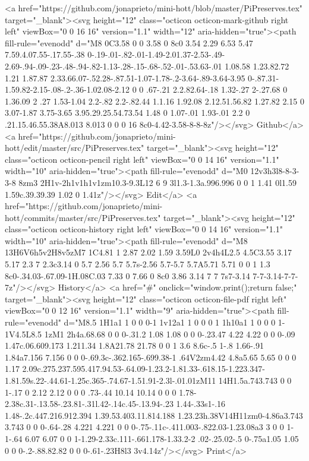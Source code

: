       <a href="https://github.com/jonaprieto/mini-hott/blob/master/PiPreserves.tex" target="_blank"><svg height="12" class="octicon octicon-mark-github right left" viewBox="0 0 16 16" version="1.1" width="12" aria-hidden="true"><path fill-rule="evenodd" d="M8 0C3.58 0 0 3.58 0 8c0 3.54 2.29 6.53 5.47 7.59.4.07.55-.17.55-.38 0-.19-.01-.82-.01-1.49-2.01.37-2.53-.49-2.69-.94-.09-.23-.48-.94-.82-1.13-.28-.15-.68-.52-.01-.53.63-.01 1.08.58 1.23.82.72 1.21 1.87.87 2.33.66.07-.52.28-.87.51-1.07-1.78-.2-3.64-.89-3.64-3.95 0-.87.31-1.59.82-2.15-.08-.2-.36-1.02.08-2.12 0 0 .67-.21 2.2.82.64-.18 1.32-.27 2-.27.68 0 1.36.09 2 .27 1.53-1.04 2.2-.82 2.2-.82.44 1.1.16 1.92.08 2.12.51.56.82 1.27.82 2.15 0 3.07-1.87 3.75-3.65 3.95.29.25.54.73.54 1.48 0 1.07-.01 1.93-.01 2.2 0 .21.15.46.55.38A8.013 8.013 0 0 0 16 8c0-4.42-3.58-8-8-8z"/></svg> Github</a>
      <a href="https://github.com/jonaprieto/mini-hott/edit/master/src/PiPreserves.tex" target="_blank"><svg height="12" class="octicon octicon-pencil right left" viewBox="0 0 14 16" version="1.1" width="10" aria-hidden="true"><path fill-rule="evenodd" d="M0 12v3h3l8-8-3-3-8 8zm3 2H1v-2h1v1h1v1zm10.3-9.3L12 6 9 3l1.3-1.3a.996.996 0 0 1 1.41 0l1.59 1.59c.39.39.39 1.02 0 1.41z"/></svg> Edit</a>
      <a href="https://github.com/jonaprieto/mini-hott/commits/master/src/PiPreserves.tex" target="_blank"><svg height="12" class="octicon octicon-history right left" viewBox="0 0 14 16" version="1.1" width="10" aria-hidden="true"><path fill-rule="evenodd" d="M8 13H6V6h5v2H8v5zM7 1C4.81 1 2.87 2.02 1.59 3.59L0 2v4h4L2.5 4.5C3.55 3.17 5.17 2.3 7 2.3c3.14 0 5.7 2.56 5.7 5.7s-2.56 5.7-5.7 5.7A5.71 5.71 0 0 1 1.3 8c0-.34.03-.67.09-1H.08C.03 7.33 0 7.66 0 8c0 3.86 3.14 7 7 7s7-3.14 7-7-3.14-7-7-7z"/></svg> History</a>
      <a  href="#" onclick="window.print();return false;" target="_blank"><svg height="12" class="octicon octicon-file-pdf right left" viewBox="0 0 12 16" version="1.1" width="9" aria-hidden="true"><path fill-rule="evenodd" d="M8.5 1H1a1 1 0 0 0-1 1v12a1 1 0 0 0 1 1h10a1 1 0 0 0 1-1V4.5L8.5 1zM1 2h4a.68.68 0 0 0-.31.2 1.08 1.08 0 0 0-.23.47 4.22 4.22 0 0 0-.09 1.47c.06.609.173 1.211.34 1.8A21.78 21.78 0 0 1 3.6 8.6c-.5 1-.8 1.66-.91 1.84a7.156 7.156 0 0 0-.69.3c-.362.165-.699.38-1 .64V2zm4.42 4.8a5.65 5.65 0 0 0 1.17 2.09c.275.237.595.417.94.53-.64.09-1.23.2-1.81.33-.618.15-1.223.347-1.81.59s.22-.44.61-1.25c.365-.74.67-1.51.91-2.3l-.01.01zM11 14H1.5a.743.743 0 0 1-.17 0 2.12 2.12 0 0 0 .73-.44 10.14 10.14 0 0 0 1.78-2.38c.31-.13.58-.23.81-.31l.42-.14c.45-.13.94-.23 1.44-.33s1-.16 1.48-.2c.447.216.912.394 1.39.53.403.11.814.188 1.23.23h.38V14H11zm0-4.86a3.743 3.743 0 0 0-.64-.28 4.221 4.221 0 0 0-.75-.11c-.411.003-.822.03-1.23.08a3 3 0 0 1-1-.64 6.07 6.07 0 0 1-1.29-2.33c.111-.661.178-1.33.2-2 .02-.25.02-.5 0-.75a1.05 1.05 0 0 0-.2-.88.82.82 0 0 0-.61-.23H8l3 3v4.14z"/></svg> Print</a>
